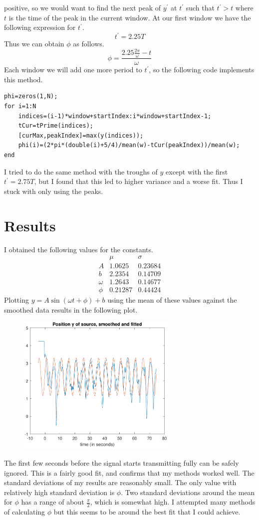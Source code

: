 \documentclass[12pt]{article}
\begin{document}
positive, so we would want to find the next peak of \(y^\prime\) at \(t^\prime\) such
that \(t^\prime>t\) where \(t\) is the time of the peak in the current window. At our first window we have
the following expression for \(t^\prime\).
\[t^\prime = 2.25T\]
Thus we can obtain \(\phi\) as follows.
\[\phi=\frac{2.25\frac{2\pi}{\omega} - t}{\omega}\]
Each window we will add one more period to \(t^\prime\), so the following code implements this method.
\small
\begin{verbatim}
phi=zeros(1,N);
for i=1:N
    indices=(i-1)*window+startIndex:i*window+startIndex-1;
    tCur=tPrime(indices);
    [curMax,peakIndex]=max(y(indices));
    phi(i)=(2*pi*(double(i)+5/4)/mean(w)-tCur(peakIndex))/mean(w);
end
\end{verbatim}
\normalsize
I tried to do the same method with the troughs of \(y\) except with the first \(t^\prime=2.75T\), but I
found that this led to higher variance and a worse fit. Thus I stuck with only using the peaks.

\section{Results}

I obtained the following values for the constants.
\[\begin{array}{c|cc}
    & \mu & \sigma\\
    \hline
    A & 1.0625 & 0.23684\\
    b & 2.2354 & 0.14709\\
    \omega & 1.2643 & 0.14677\\
    \phi & 0.21287 & 0.44424
\end{array}\]
Plotting \(y=A\sin(\omega t + \phi) + b\) using the mean of these values against the smoothed data results
in the following plot.
\begin{figure}[H]
    \begin{center}
        \includegraphics[width=3in]{y-fitted.pdf}
    \end{center}
\end{figure}
The first few seconds before the signal starts transmitting fully can be safely ignored. This is a fairly
good fit, and confirms that my methods worked well. The standard deviations of my results are reasonably small.
The only value with relatively high standard deviation is \(\phi\). Two standard deviations around the mean for \(\phi\)
has a range of about \(\frac{\pi}{2}\), which is somewhat high. I attempted many methods of calculating \(\phi\)
but this seems to be around the best fit that I could achieve.



\end{document}
